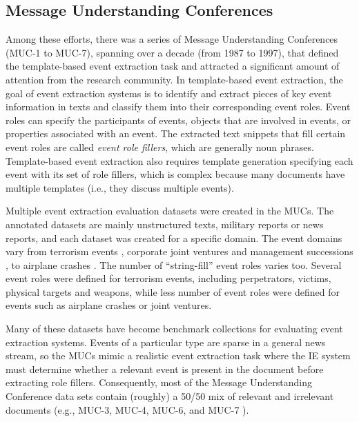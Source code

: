 \subsection{Message Understanding Conferences}

Among these efforts, there was a series of Message Understanding 
Conferences (MUC-1 to MUC-7), spanning over a decade (from 1987 to 1997), 
that defined the template-based event extraction task 
and attracted a significant amount of attention from the 
research community. 
In template-based event extraction, the goal of event extraction systems 
is to identify and extract pieces of key event 
information in texts and classify them into their corresponding 
event roles. 
Event roles can specify the participants of events, 
objects that are involved in events, or properties 
associated with an event.
The extracted text snippets that fill certain event roles 
are called {\it event role fillers}, which are generally noun phrases. 
Template-based event extraction also requires template 
generation specifying each event with its set of role fillers, 
which is complex because many documents have multiple
 templates (i.e., they discuss multiple events).

Multiple event extraction evaluation datasets 
were created in the MUCs. 
The annotated datasets are mainly unstructured texts, military reports or 
news reports, and each dataset was created for a specific domain. 
The event domains vary from 
terrorism events \cite{muc4-proceedings},  
corporate joint ventures \cite{muc5-proceedings} and management successions \cite{muc6-proceedings}, 
to airplane crashes \cite{muc7-proceedings}.
The number of 
``string-fill''
event roles varies too. 
Several event roles were defined for terrorism events, 
including perpetrators, victims, physical targets and weapons, 
while 
less number of event roles were defined 
for events such as airplane crashes or joint ventures. 

Many of these datasets have become benchmark collections 
for evaluating event extraction systems. 
Events of a particular type are sparse in 
a general news stream, so the MUCs 
mimic a realistic event extraction task where the IE system
must determine whether a relevant event is present in the document 
before extracting role fillers.  
Consequently, most of the
Message Understanding Conference data sets 
contain (roughly) a 50/50 mix of relevant and
irrelevant documents (e.g., MUC-3, MUC-4, MUC-6, and MUC-7 \cite{hirschman98}).



